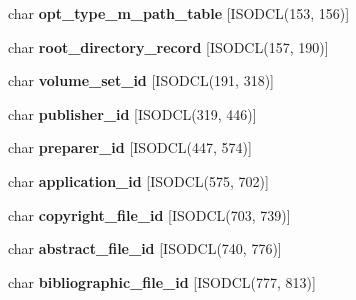 \begin{DoxyCompactItemize}
char {\bfseries opt\+\_\+type\+\_\+m\+\_\+path\+\_\+table} \mbox{[}I\+S\+O\+D\+CL(153, 156)\mbox{]}
\item 
\mbox{\label{structiso__enhanced__descriptor_ac80a30d1125d459f37ab1e9de37d0ce4}} 
char {\bfseries root\+\_\+directory\+\_\+record} \mbox{[}I\+S\+O\+D\+CL(157, 190)\mbox{]}
\item 
\mbox{\label{structiso__enhanced__descriptor_a0a3ec8dbe8ba9541901eed1f0b250570}} 
char {\bfseries volume\+\_\+set\+\_\+id} \mbox{[}I\+S\+O\+D\+CL(191, 318)\mbox{]}
\item 
\mbox{\label{structiso__enhanced__descriptor_ab9681f343a42c920f834e16beb604a23}} 
char {\bfseries publisher\+\_\+id} \mbox{[}I\+S\+O\+D\+CL(319, 446)\mbox{]}
\item 
\mbox{\label{structiso__enhanced__descriptor_a6e44808b38e8ee57b3cb17534a8fd5ec}} 
char {\bfseries preparer\+\_\+id} \mbox{[}I\+S\+O\+D\+CL(447, 574)\mbox{]}
\item 
\mbox{\label{structiso__enhanced__descriptor_a266077cd719d319b150b4a4d7ff69313}} 
char {\bfseries application\+\_\+id} \mbox{[}I\+S\+O\+D\+CL(575, 702)\mbox{]}
\item 
\mbox{\label{structiso__enhanced__descriptor_af00a6406f5e6e52b87962371e953dc38}} 
char {\bfseries copyright\+\_\+file\+\_\+id} \mbox{[}I\+S\+O\+D\+CL(703, 739)\mbox{]}
\item 
\mbox{\label{structiso__enhanced__descriptor_a0e1bc756e5d97fa45d0c7ef22d0ec482}} 
char {\bfseries abstract\+\_\+file\+\_\+id} \mbox{[}I\+S\+O\+D\+CL(740, 776)\mbox{]}
\item 
\mbox{\label{structiso__enhanced__descriptor_a422d0e4dce87845ae3dd9d35718b9a3d}} 
char {\bfseries bibliographic\+\_\+file\+\_\+id} \mbox{[}I\+S\+O\+D\+CL(777, 813)\mbox{]}
\item 
\mbox{\label{structiso__enhanced__descriptor_ae31670eb40dcf9805086b8b4a747e276}} 

\end{DoxyCompactItemize}
